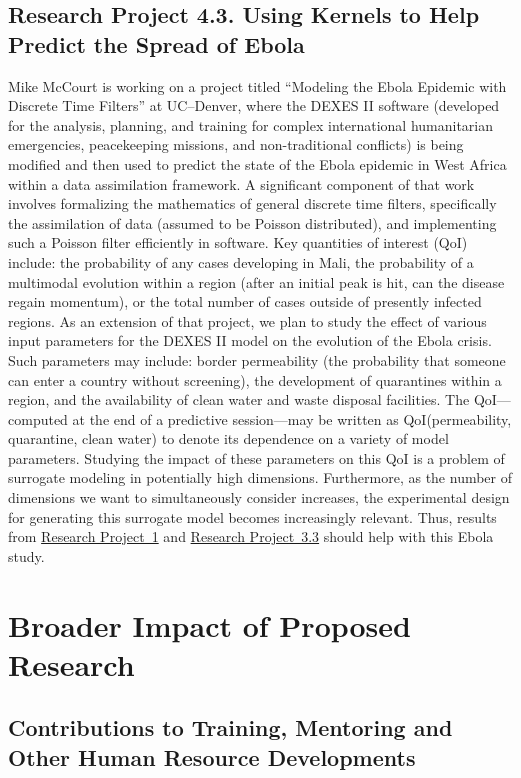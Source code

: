 \documentclass[11pt]{NSFamsart}
\newcommand{\refproba}{\hyperref[SectHSSVD]{Research Project~1}\xspace}
\newcommand{\refprobcc}{\hyperref[designsubsec]{Research Project~3.3}\xspace}
\begin{document}
\subsection*{Research Project 4.3. Using Kernels to Help Predict the Spread of Ebola} \label{ebolasubsec}
Mike McCourt is working on a project titled ``Modeling the Ebola Epidemic with Discrete Time Filters'' at UC--Denver, where the DEXES II software (developed for the analysis, planning, and training for complex international humanitarian emergencies, peacekeeping missions, and non-traditional conflicts) is being modified and then used to predict the state of the Ebola epidemic in West Africa within a data assimilation framework. A significant component of that work involves formalizing the mathematics of general discrete time filters, specifically the assimilation of data (assumed to be Poisson distributed), and implementing such a Poisson filter efficiently in software. Key quantities of interest (QoI) include: the probability of any cases developing in Mali, the probability of a multimodal evolution within a region (after an initial peak is hit, can the disease regain momentum), or the total number of cases outside of presently infected regions.
As an extension of that project, we plan to study the effect of various input parameters for 
the DEXES II model on the evolution of the Ebola crisis.  Such parameters may include: 
border permeability (the probability that someone can enter a country without screening), 
the development of quarantines within a region, and the availability of clean water and waste 
disposal facilities.  The QoI---computed at the end of a predictive session---may be written 
as QoI(permeability, quarantine, clean water) to denote its dependence on a variety of model 
parameters.  Studying the impact of these parameters on this QoI is a problem of surrogate 
modeling in potentially high dimensions.  Furthermore, as the number of dimensions we want 
to simultaneously consider increases, the experimental design for generating this surrogate 
model becomes increasingly relevant.  Thus, results from \refproba and \refprobcc should 
help with this Ebola study.



\section{Broader Impact of Proposed Research}\label{SectBroad}


\subsection{Contributions to Training, Mentoring and Other Human Resource Developments}
\end{document}
